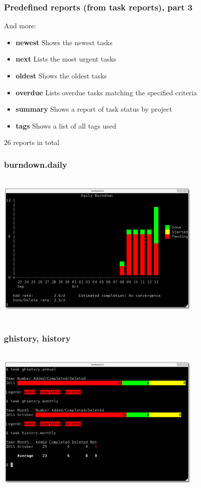 \documentclass[t,handout]{beamer}
\begin{document}
\begin{frame}
\frametitle{Predefined reports (from task reports), part 3}

And more:

\begin{itemize}
\item \textbf{newest}           Shows the newest tasks
\item \textbf{next}             Lists the most urgent tasks
\item \textbf{oldest}           Shows the oldest tasks
\item \textbf{overdue}          Lists overdue tasks matching the specified criteria
\item \textbf{summary}          Shows a report of task status by project
\item \textbf{tags}             Shows a list of all tags used
\end{itemize}

26 reports in total
\end{frame}

\begin{frame}
\frametitle{burndown.daily}
\begin{center}
\includegraphics[width=10cm,height=7.5cm]{reports01.png}
\end{center}
\end{frame}

\begin{frame}
\frametitle{ghistory, history}
\begin{center}
\includegraphics[width=10cm,height=7.5cm]{reports02.png}
\end{center}
\end{frame}
\end{document}
